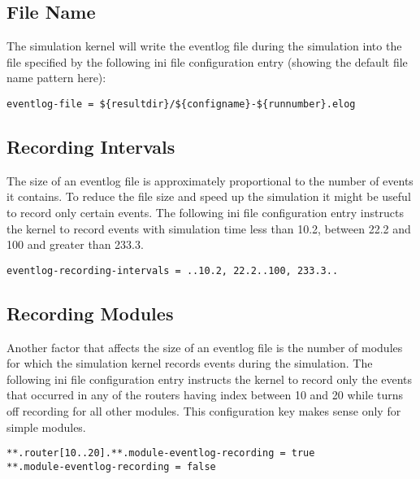 \subsection{File Name}
The simulation kernel will write the eventlog file during the simulation into the file
specified by the following ini file configuration entry (showing the default file name
pattern here):
\begin{verbatim}
eventlog-file = ${resultdir}/${configname}-${runnumber}.elog
\end{verbatim}

\subsection{Recording Intervals}
The size of an eventlog file is approximately proportional to the number of events it
contains. To reduce the file size and speed up the simulation it might be useful to record
only certain events. The following ini file configuration entry instructs the kernel to
record events with simulation time less than 10.2, between 22.2 and 100 and greater than
233.3.
\begin{verbatim}
eventlog-recording-intervals = ..10.2, 22.2..100, 233.3..
\end{verbatim}

\subsection{Recording Modules}
Another factor that affects the size of an eventlog file is the number of modules for
which the simulation kernel records events during the simulation. The following ini file
configuration entry instructs the kernel to record only the events that occurred in any of
the routers having index between 10 and 20 while turns off recording for all other
modules. This configuration key makes sense only for simple modules.
\begin{verbatim}
**.router[10..20].**.module-eventlog-recording = true
**.module-eventlog-recording = false
\end{verbatim}

